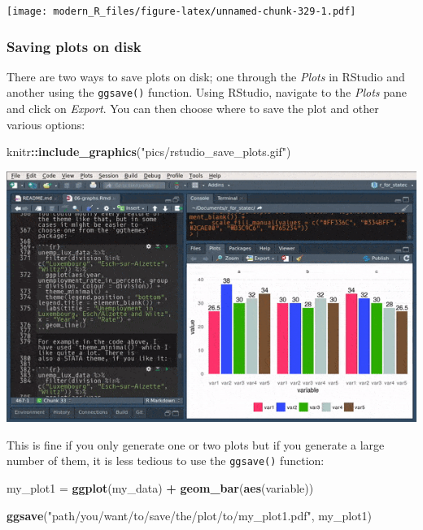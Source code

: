 \documentclass[]{gitbook}
\newenvironment{Shaded}{\begin{snugshade}}{\end{snugshade}}
\newcommand{\KeywordTok}[1]{\textcolor[rgb]{0.13,0.29,0.53}{\textbf{#1}}}
\newcommand{\NormalTok}[1]{#1}
\newcommand{\OperatorTok}[1]{\textcolor[rgb]{0.81,0.36,0.00}{\textbf{#1}}}
\newcommand{\StringTok}[1]{\textcolor[rgb]{0.31,0.60,0.02}{#1}}
\theoremstyle{definition}
\theoremstyle{definition}
\theoremstyle{definition}
\theoremstyle{remark}
\begin{document}
\texttt{[image: modern\_R\_files/figure-latex/unnamed-chunk-329-1.pdf]}

\hypertarget{saving-plots-on-disk}{%
\subsubsection{Saving plots on disk}\label{saving-plots-on-disk}}

There are two ways to save plots on disk; one through the \emph{Plots}
in RStudio and another using the \texttt{ggsave()} function. Using
RStudio, navigate to the \emph{Plots} pane and click on \emph{Export}.
You can then choose where to save the plot and other various options:

\begin{Shaded}
\begin{Highlighting}[]
\NormalTok{knitr}\OperatorTok{::}\KeywordTok{include_graphics}\NormalTok{(}\StringTok{"pics/rstudio_save_plots.gif"}\NormalTok{)}
\end{Highlighting}
\end{Shaded}

\includegraphics{pics/rstudio_save_plots.gif}

This is fine if you only generate one or two plots but if you generate a
large number of them, it is less tedious to use the \texttt{ggsave()}
function:

\begin{Shaded}
\begin{Highlighting}[]
\NormalTok{my_plot1 =}\StringTok{ }\KeywordTok{ggplot}\NormalTok{(my_data) }\OperatorTok{+}
\StringTok{  }\KeywordTok{geom_bar}\NormalTok{(}\KeywordTok{aes}\NormalTok{(variable))}

\KeywordTok{ggsave}\NormalTok{(}\StringTok{"path/you/want/to/save/the/plot/to/my_plot1.pdf"}\NormalTok{, my_plot1)}
\end{Highlighting}
\end{Shaded}
\end{document}
